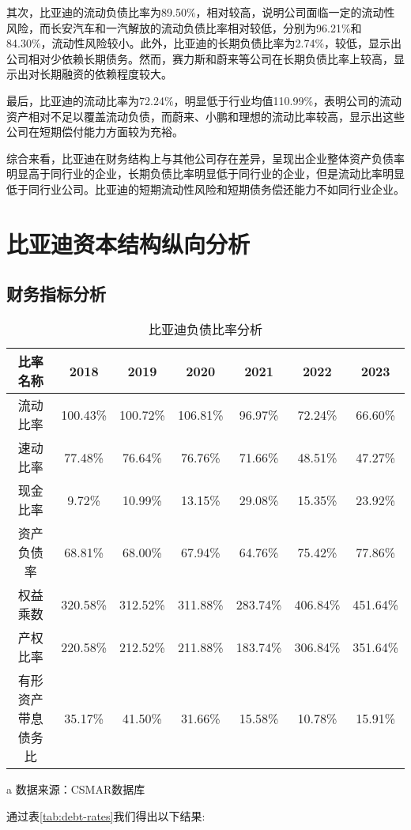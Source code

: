其次，比亚迪的流动负债比率为89.50\%，相对较高，说明公司面临一定的流动性风险，而长安汽车和一汽解放的流动负债比率相对较低，分别为96.21\%和84.30\%，流动性风险较小。此外，比亚迪的长期负债比率为2.74\%，较低，显示出公司相对少依赖长期债务。然而，赛力斯和蔚来等公司在长期负债比率上较高，显示出对长期融资的依赖程度较大。

最后，比亚迪的流动比率为72.24\%，明显低于行业均值110.99\%，表明公司的流动资产相对不足以覆盖流动负债，而蔚来、小鹏和理想的流动比率较高，显示出这些公司在短期偿付能力方面较为充裕。

综合来看，比亚迪在财务结构上与其他公司存在差异，呈现出企业整体资产负债率明显高于同行业的企业，长期负债比率明显低于同行业的企业，但是流动比率明显低于同行业公司。比亚迪的短期流动性风险和短期债务偿还能力不如同行业企业。
\section{比亚迪资本结构纵向分析}
\subsection{财务指标分析}
\begin{table}
  \centering
  \begin{threeparttable}[c]
    \caption{比亚迪负债比率分析}
    \label{tab:debt-rates}
    \begin{tabular}{ccccccc}
      \toprule
        比率名称 & 2018 & 2019 & 2020 & 2021 & 2022 & 2023 \\
      \midrule
        流动比率 & 100.43\% & 100.72\% & 106.81\% & 96.97\% & 72.24\% & 66.60\% \\
        速动比率 & 77.48\% & 76.64\% & 76.76\% & 71.66\% & 48.51\% & 47.27\% \\
        现金比率 & 9.72\% & 10.99\% & 13.15\% & 29.08\% & 15.35\% & 23.92\% \\
        资产负债率 & 68.81\% & 68.00\% & 67.94\% & 64.76\% & 75.42\% & 77.86\% \\
        权益乘数 & 320.58\% & 312.52\% & 311.88\% & 283.74\% & 406.84\% & 451.64\% \\
        产权比率 & 220.58\% & 212.52\% & 211.88\% & 183.74\% & 306.84\% & 351.64\% \\
        有形资产带息债务比 & 35.17\% & 41.50\% & 31.66\% & 15.58\% & 10.78\% & 15.91\% \\
      \bottomrule
    \end{tabular}
    \begin{tablenotes}
      \item [a] 数据来源：CSMAR数据库
    \end{tablenotes}
  \end{threeparttable}
\end{table}
通过表\eqref{tab:debt-rates}我们得出以下结果:

